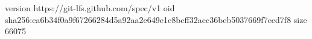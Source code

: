 version https://git-lfs.github.com/spec/v1
oid sha256:ca6b34f0a9f67266284d5a92aa2e649e1e8bcff32acc36beb5037669f7ecd7f8
size 66075
